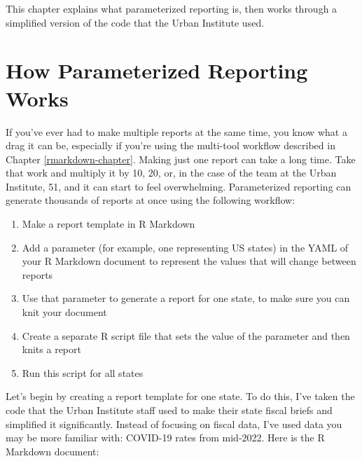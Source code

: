 \documentclass[
]{book}
\begin{document}
This chapter explains what parameterized reporting is, then works through a simplified version of the code that the Urban Institute used.

\hypertarget{how-parameterized-reporting-works}{%
\section*{How Parameterized Reporting Works}\label{how-parameterized-reporting-works}}

If you've ever had to make multiple reports at the same time, you know what a drag it can be, especially if you're using the multi-tool workflow described in Chapter \ref{rmarkdown-chapter}. Making just one report can take a long time. Take that work and multiply it by 10, 20, or, in the case of the team at the Urban Institute, 51, and it can start to feel overwhelming. Parameterized reporting can generate thousands of reports at once using the following workflow:

\begin{enumerate}
\def\labelenumi{\arabic{enumi}.}
\item
  Make a report template in R Markdown
\item
  Add a parameter (for example, one representing US states) in the YAML of your R Markdown document to represent the values that will change between reports
\item
  Use that parameter to generate a report for one state, to make sure you can knit your document
\item
  Create a separate R script file that sets the value of the parameter and then knits a report
\item
  Run this script for all states
\end{enumerate}

Let's begin by creating a report template for one state. To do this, I've taken the code that the Urban Institute staff used to make their state fiscal briefs and simplified it significantly. Instead of focusing on fiscal data, I've used data you may be more familiar with: COVID-19 rates from mid-2022. Here is the R Markdown document:
\end{document}
